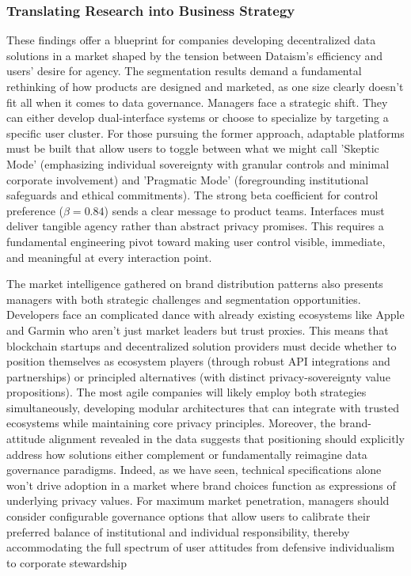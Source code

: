 	\subsubsection{Translating Research into Business Strategy}
	These findings offer a blueprint for companies developing decentralized data solutions in a market shaped by the tension between Dataism's efficiency and users' desire for agency. The segmentation results demand a fundamental rethinking of how products are designed and marketed, as one size clearly doesn't fit all when it comes to data governance. Managers face a strategic shift. They can either develop dual-interface systems or choose to specialize by targeting a specific user cluster. For those pursuing the former approach, adaptable platforms must be built that allow users to toggle between what we might call 'Skeptic Mode' (emphasizing individual sovereignty with granular controls and minimal corporate involvement) and 'Pragmatic Mode' (foregrounding institutional safeguards and ethical commitments). The strong beta coefficient for control preference ($\beta = 0.84$) sends a clear message to product teams. Interfaces must deliver tangible agency rather than abstract privacy promises. This requires a fundamental engineering pivot toward making user control visible, immediate, and meaningful at every interaction point.

	The market intelligence gathered on brand distribution patterns also presents managers with both strategic challenges and segmentation opportunities. Developers face an complicated dance with already existing ecosystems like Apple and Garmin who aren't just market leaders but trust proxies. This means that blockchain startups and decentralized solution providers must decide whether to position themselves as ecosystem players (through robust API integrations and partnerships) or principled alternatives (with distinct privacy-sovereignty value propositions). The most agile companies will likely employ both strategies simultaneously, developing modular architectures that can integrate with trusted ecosystems while maintaining core privacy principles. Moreover, the brand-attitude alignment revealed in the data suggests that positioning should explicitly address how solutions either complement or fundamentally reimagine data governance paradigms. Indeed, as we have seen, technical specifications alone won't drive adoption in a market where brand choices function as expressions of underlying privacy values. For maximum market penetration, managers should consider configurable governance options that allow users to calibrate their preferred balance of institutional and individual responsibility, thereby accommodating the full spectrum of user attitudes from defensive individualism to corporate stewardship
